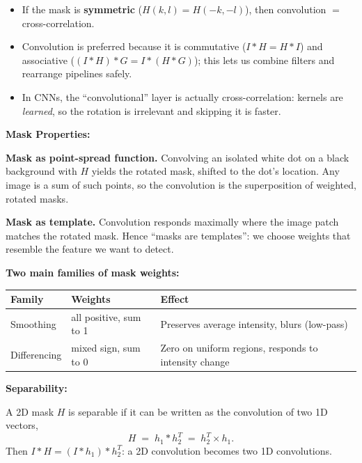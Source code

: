\begin{itemize}
  \item If the mask is \textbf{symmetric} ($H(k,l) = H(-k,-l)$), then convolution $=$ cross-correlation.
  \item Convolution is preferred because it is commutative ($I \ast H = H \ast I$) and associative ($(I \ast H) \ast G = I \ast (H \ast G)$); this lets us combine filters and rearrange pipelines safely.
  \item In CNNs, the ``convolutional'' layer is actually cross-correlation: kernels are \emph{learned}, so the rotation is irrelevant and skipping it is faster.
\end{itemize}

\separator

\textbf{Mask Properties:}

\textbf{Mask as point-spread function.} Convolving an isolated white dot on a black background with $H$ yields the rotated mask, shifted to the dot's location. Any image is a sum of such points, so the convolution is the superposition of weighted, rotated masks.

\textbf{Mask as template.} Convolution responds maximally where the image patch matches the rotated mask. Hence ``masks are templates'': we choose weights that resemble the feature we want to detect.

\textbf{Two main families of mask weights:}
\begin{center}
\renewcommand{\arraystretch}{1.3}
\begin{tabular}{@{} l p{4cm} p{6cm} @{}}
\toprule
\textbf{Family} & \textbf{Weights} & \textbf{Effect} \\
\midrule
Smoothing & all positive, sum to 1 & Preserves average intensity, blurs (low-pass) \\
Differencing & mixed sign, sum to 0 & Zero on uniform regions, responds to intensity change \\
\bottomrule
\end{tabular}
\end{center}

\separator

\textbf{Separability:}

\begin{defbox}
A 2D mask $H$ is separable if it can be written as the convolution of two 1D vectors,
\[
H \;=\; h_1 \ast h_2^T \;=\; h_2^T \times h_1.
\]
Then $I \ast H = (I \ast h_1) \ast h_2^T$: a 2D convolution becomes two 1D convolutions.
\end{defbox}

